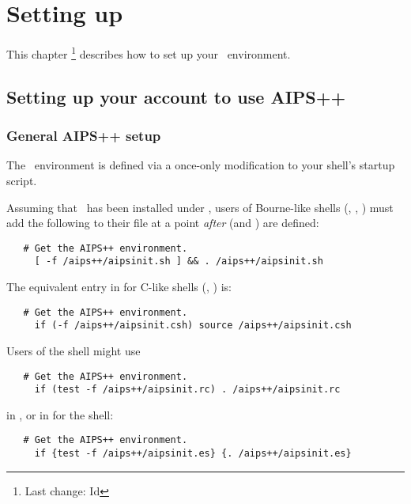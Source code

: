 \chapter{Setting up}
\label{Setting up}

This chapter \footnote{Last change:
$ $Id$ $}
describes how to set up your \aipspp\ environment.


\section{Setting up your account to use AIPS++}
\label{Setup}

\subsection{General AIPS++ setup}

The \aipspp\ environment is defined via a once-only modification to your
shell's startup script.

Assuming that \aipspp\ has been installed under , users of
Bourne-like shells (, , ) must add the
following to their  file at a point {\em after} 
(and ) are defined:

\begin{verbatim}
   # Get the AIPS++ environment.
     [ -f /aips++/aipsinit.sh ] && . /aips++/aipsinit.sh
\end{verbatim}

\noindent
The equivalent entry in  for C-like shells (,
) is:

\begin{verbatim}
   # Get the AIPS++ environment.
     if (-f /aips++/aipsinit.csh) source /aips++/aipsinit.csh
\end{verbatim}

\noindent
Users of the  shell might use

\begin{verbatim}
   # Get the AIPS++ environment.
     if (test -f /aips++/aipsinit.rc) . /aips++/aipsinit.rc
\end{verbatim}

\noindent
in , or in  for the  shell:

\begin{verbatim}
   # Get the AIPS++ environment.
     if {test -f /aips++/aipsinit.es} {. /aips++/aipsinit.es}
\end{verbatim}

